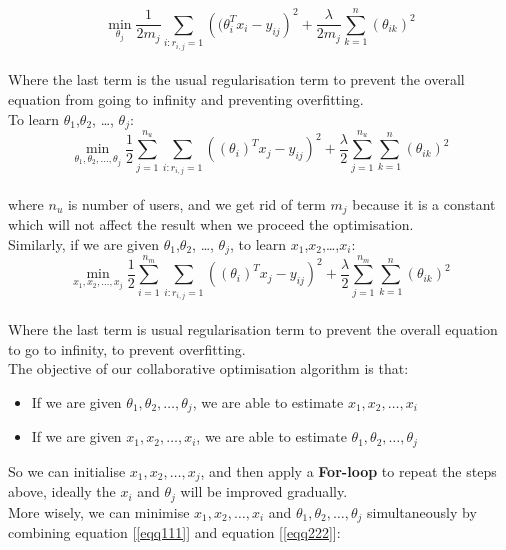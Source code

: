 \begin{equation*}
\min_{\theta_{j}} \frac{1}{2m_{j}}\sum_{i:r_{i,j} = 1}\left((\theta_{i}^{T}x_{i}-y_{ij}\right)^{2} + \frac{\lambda}{2m_{j}}\sum_{k = 1}^{n}(\theta_{ik})^{2}
\end{equation*}
\\Where the last term is the usual regularisation term to prevent the overall equation from going to infinity and preventing overfitting.
\\To learn $\theta_{1}$,$\theta_{2}$, \dots, $\theta_{j}$:
\begin{equation}
\label{eqq111}
\min_{\theta_{1},\theta_{2}, \dots, \theta_{j}} \frac{1}{2}\sum_{j = 1}^{n_{u}}\sum_{i:r_{i,j} = 1}\left((\theta_{i})^{T}x_{j}-y_{ij}\right)^{2} + \frac{\lambda}{2}\sum_{j = 1}^{n_{u}}\sum_{k = 1}^{n}(\theta_{ik})^{2}
\end{equation}
\\where $n_{u}$ is number of users, and we get rid of term $m_{j}$ because it is a constant which will not affect the result when we proceed the optimisation.
\\Similarly, if we are given $\theta_{1}$,$\theta_{2}$, \dots, $\theta_{j}$, to learn $x_{1}$,$x_{2}$,\dots,$x_{i}$:
\begin{equation}
\label{eqq222}
\min_{x_{1},x_{2}, \dots,x_{j}} \frac{1}{2}\sum_{i = 1}^{n_{m}}\sum_{i:r_{i,j} = 1}\left((\theta_{i})^{T}x_{j}-y_{ij}\right)^{2} + \frac{\lambda}{2}\sum_{j = 1}^{n_{m}}\sum_{k = 1}^{n}(\theta_{ik})^{2}
\end{equation}
\\Where the last term is usual regularisation term to prevent the overall equation to go to infinity, to prevent overfitting.
\\The objective of our collaborative optimisation algorithm is that:
\begin{itemize}
\item If we are given $\theta_{1},\theta_{2}, \dots, \theta_{j}$, we are able to estimate $x_{1},x_{2}, \dots,x_{i}$
\item If we are given $x_{1},x_{2}, \dots,x_{i}$, we are able to estimate $\theta_{1},\theta_{2}, \dots, \theta_{j}$
\end{itemize}
So we can initialise $x_{1},x_{2}, \dots,x_{j}$, and then apply a \textbf{For-loop} to repeat the steps above, ideally the $x_{i}$ and $\theta_{j}$ will be improved gradually. 
\\ More wisely, we can minimise $x_{1},x_{2}, \dots,x_{i}$ and $\theta_{1},\theta_{2}, \dots, \theta_{j}$ simultaneously by combining equation [\ref{eqq111}] and equation [\ref{eqq222}]:
